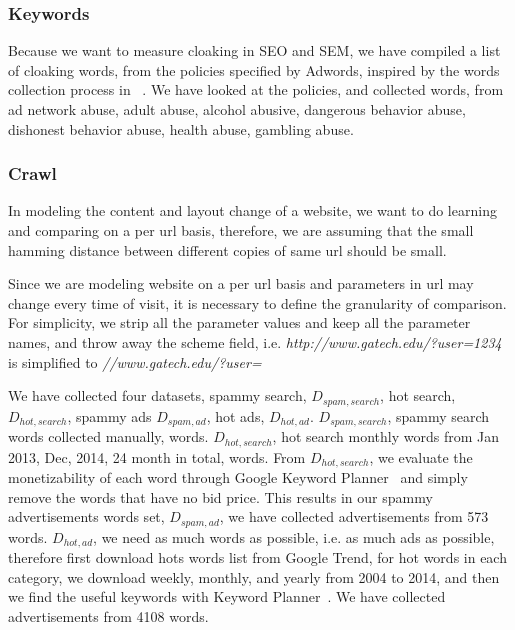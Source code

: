 \subsubsection{Keywords}
Because we want to measure cloaking in SEO and SEM, we have compiled a list of
cloaking words, from the policies specified by Adwords, inspired by the words
collection process in ~\cite{wang2011cloak}. We have looked at the policies, and
collected  words, from ad network abuse, adult abuse, alcohol abusive, dangerous behavior
abuse, dishonest behavior abuse, health abuse, gambling abuse.


\subsubsection{Crawl}

In modeling the content and layout change of a website, we want to do learning
and comparing on a per url basis, therefore, we are assuming that the small hamming
distance between different copies of same url should be small.

Since we are modeling website on a per url basis and parameters in url may
change every time of visit, it is necessary to define the granularity of
comparison. For simplicity, we strip all the parameter
values and keep all the parameter names, and throw away the scheme field, i.e.
{\it http://www.gatech.edu/?user=1234} is simplified to
{\it //www.gatech.edu/?user=}





We have collected four datasets, spammy search, $D_{spam, search}$, hot search,
$D_{hot, search}$, spammy ads $D_{spam, ad}$, hot ads, $D_{hot, ad}$. 
$D_{spam, search}$, spammy search words collected manually,  words.
$D_{hot, search}$, hot search monthly words from Jan 2013, Dec, 2014, 24 month
in total,   words.
From $D_{hot, search}$, we evaluate the monetizability of each word through
Google Keyword Planner~\cite{keyword-planner} and simply
remove the words that have no bid price. This results in our spammy
advertisements words set, $D_{spam, ad}$, we have collected advertisements from 573 words.
$D_{hot, ad}$, we need as much words as possible, i.e. as much ads as possible,
therefore first download hots words list from Google Trend, for hot words in
each category, we download weekly, monthly, and yearly from 2004 to 2014, and
then we find the useful keywords with Keyword Planner~\cite{keyword-planner}.
We have collected advertisements from 4108 words.

